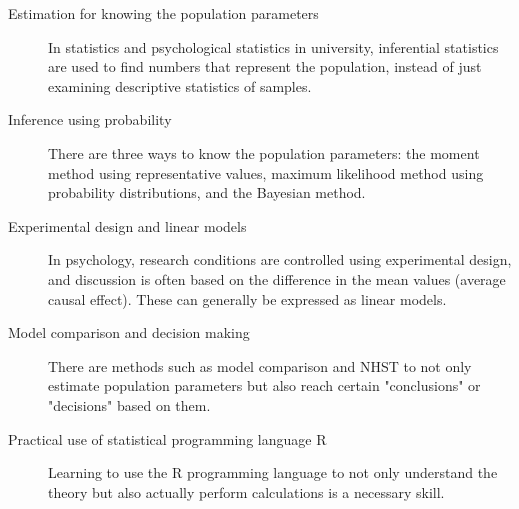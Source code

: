 \begin{description}
	\item[Estimation for knowing the population parameters] In statistics and psychological statistics in university, inferential statistics are used to find numbers that represent the population, instead of just examining descriptive statistics of samples.
	\item[Inference using probability] There are three ways to know the population parameters: the moment method using representative values, maximum likelihood method using probability distributions, and the Bayesian method.
	\item[Experimental design and linear models] In psychology, research conditions are controlled using experimental design, and discussion is often based on the difference in the mean values (average causal effect). These can generally be expressed as linear models.
	\item[Model comparison and decision making] There are methods such as model comparison and NHST to not only estimate population parameters but also reach certain "conclusions" or "decisions" based on them.
	\item[Practical use of statistical programming language R] Learning to use the R programming language to not only understand the theory but also actually perform calculations is a necessary skill.
\end{description}
